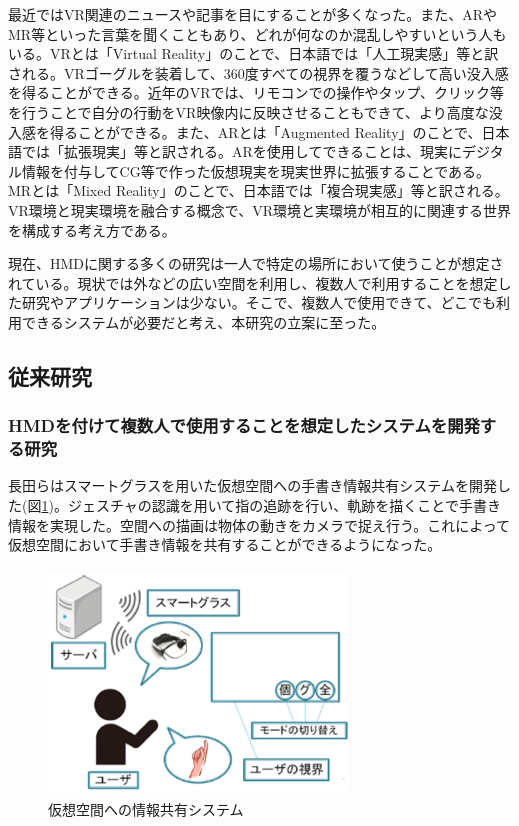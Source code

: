 \documentclass[11pt,a4j, titlepage]{jarticle} %
\begin{document}
最近ではVR関連のニュースや記事を目にすることが多くなった。また、ARやMR等といった言葉を聞くこともあり、どれが何なのか混乱しやすいという人もいる。VRとは「Virtual Reality」のことで、日本語では「人工現実感」等と訳される。VRゴーグルを装着して、360度すべての視界を覆うなどして高い没入感を得ることができる。近年のVRでは、リモコンでの操作やタップ、クリック等を行うことで自分の行動をVR映像内に反映させることもできて、より高度な没入感を得ることができる。また、ARとは「Augmented Reality」のことで、日本語では「拡張現実」等と訳される。ARを使用してできることは、現実にデジタル情報を付与してCG等で作った仮想現実を現実世界に拡張することである。MRとは「Mixed Reality」のことで、日本語では「複合現実感」等と訳される。VR環境と現実環境を融合する概念で、VR環境と実環境が相互的に関連する世界を構成する考え方である。

現在、HMDに関する多くの研究は一人で特定の場所において使うことが想定されている。現状では外などの広い空間を利用し、複数人で利用することを想定した研究やアプリケーションは少ない。そこで、複数人で使用できて、どこでも利用できるシステムが必要だと考え、本研究の立案に至った。

\subsection{従来研究}
\subsubsection{HMDを付けて複数人で使用することを想定したシステムを開発する研究}
長田ら\cite{nagata}はスマートグラスを用いた仮想空間への手書き情報共有システムを開発した(図\ref{fig:kasoukuukan})。ジェスチャの認識を用いて指の追跡を行い、軌跡を描くことで手書き情報を実現した。空間への描画は物体の動きをカメラで捉え行う。これによって仮想空間において手書き情報を共有することができるようになった。

\begin{figure}[H]
  \begin{center}
    \includegraphics[clip,height=6.0cm,width=8.0cm]{./kasoukuukan.eps}
    \caption{仮想空間への情報共有システム}
    \label{fig:kasoukuukan}
  \end{center}
\end{figure}
\end{document}
